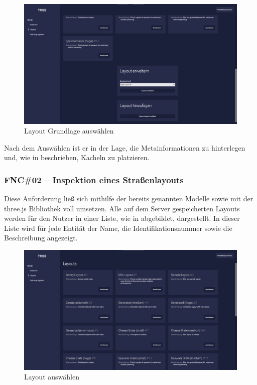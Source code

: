 \begin{figure}[htb]
    \centering
    \includegraphics[scale=.25,center]{medien/screenshots/layout-base.png}
    \caption{Layout Grundlage auswählen}
    \ownsource
    \label{fig:layout-base}
\end{figure}

Nach dem Auswählen ist er in der Lage, die Metainformationen zu hinterlegen und, wie in  beschrieben, Kacheln zu platzieren.

\FloatBarrier

\subsubsection{FNC\#02 – Inspektion eines Straßenlayouts}

Diese Anforderung ließ sich mithilfe der bereits genannten Modelle sowie mit der three.js Bibliothek voll umsetzen.
Alle auf dem Server gespeicherten Layouts werden für den Nutzer in einer Liste, wie in  abgebildet, dargestellt.
In dieser Liste wird für jede Entität der Name, die Identifikationsnummer sowie die Beschreibung angezeigt.

\begin{figure}[htb]
    \centering
    \includegraphics[scale=.25,center]{medien/screenshots/choose-layout.png}
    \caption{Layout auswählen}
    \ownsource
    \label{fig:choose-layout}
\end{figure}

